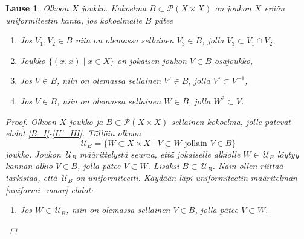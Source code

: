 \documentclass[12pt,a4paper,leqno]{report}
\newcommand{\U}{\,\mathcal{U}}
\newcommand{\Pot}{\mathcal{P}}
\theoremstyle{plain}
\newtheorem{lause}[equation]{Lause}
\theoremstyle{definition}
\theoremstyle{remark}
\begin{document}
\begin{lause}\label{uniformin kannan maar}
Olkoon $X$ joukko. 
Kokoelma $B\subset \Pot (X\times X)$ on joukon $X$ erään uniformiteetin kanta, 
jos kokoelmalle $B$ pätee
\begin{enumerate} [label=(B\arabic*)]
\item\label{B_I} Jos $V_1,V_2\in B$ niin on olemassa sellainen $V_3\in B$, jolla $V_3\subset V_1\cap V_2$,
\item\label{U'_I} Joukko $\{(x,x)\mid x\in X\}$ on jokaisen joukon $V\in B$ osajoukko,
\item\label{U'_II} Jos $V\in B$, niin on olemassa sellainen $V'\in B$, jolla $V'\subset V^{-1}%
$,
\item\label{U'_III} Jos $V\in B$, niin on olemassa sellainen $W\in B$, jolla $ W^2\subset V$.%
\end{enumerate}
\begin{proof}
Olkoon $X$ joukko ja $B\subset \Pot (X\times X)$ sellainen kokoelma, 
jolle pätevät ehdot \ref{B_I}-\ref{U'_III}. %
Tällöin olkoon 
$$\U_B=\{W\subset X\times X\mid V\subset W\text{ jollain } V\in B\}$$ 
joukko. 
Joukon $\U_B$ määrittelystä seuraa, 
että jokaiselle alkiolle $W\in\U_B$ löytyy 
kannan alkio $V\in B$, jolla pätee $V\subset W$. 
Lisäksi $ B\subset\U_B$.
Näin ollen riittää tarkistaa, että $\U_B$ on uniformiteetti. 
Käydään läpi uniformiteetin määritelmän \ref{uniformi_maar} ehdot:
\begin{enumerate} 
\item[\ref{F_I}] 
Jos $W\in \U_B$, niin on olemassa sellainen $V\in B$, jolla pätee $V\subset W$. 

\end{enumerate}
\end{proof}
\end{lause}
\end{document}

